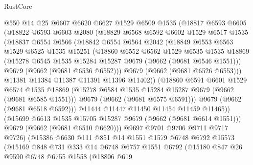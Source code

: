 \begin{lexlean}{RustCore}
\begin{coremodule}
          @550
          @14
          @25
          @6607
          @6620
          @6627
          @1529
          @6509
          @1535
          (@18817
            @6593
            @6605
            (@18822
              @6593
              @6603
              @2080
              (@18829
                @6568
                @6592
                @6602
                @1529
                @6517
                @1535
                (@18837
                  @6554
                  @6566
                  (@18842
                    @6554
                    @6564
                    @2042
                    (@18849
                      @6553
                      @6563
                      @1529
                      @6525
                      @1535
                      @15251
                      (@18860
                        @6552
                        @6562
                        @1529
                        @6535
                        @1535
                        @18869
                        (@15278 @6545 @1535 @15284 @15287 @9679 (@9662 (@9681 @6546 @1551)))
                        @9679
                        (@9662 (@9681 @6536 @6552)))
                      @9679
                      (@9662 (@9681 @6526 @6553)))
                    @11381
                    @11384
                    @11387
                    @11391
                    @11396
                    @11402))
                (@18860
                  @6591
                  @6601
                  @1529
                  @6574
                  @1535
                  @18869
                  (@15278 @6584 @1535 @15284 @15287 @9679 (@9662 (@9681 @6585 @1551)))
                  @9679
                  (@9662 (@9681 @6575 @6591)))
                @9679
                (@9662 (@9681 @6518 @6592)))
              @11444
              @11447
              @11450
              @11454
              @11459
              @11465))
          (@15699 @6613 @1535 @15705 @15287 @9679 (@9662 (@9681 @6614 @1551)))
          @9679
          (@9662 (@9681 @6510 @6620)))
        @9697
        @9701
        @9706
        @9711
        @9717
        @9726)
      (@15386
        @6630
        @111
        @851
        @14
        @1551
        @1579
        @6748
        @6792
        @15573
        (@15169
          @848
          @731
          @333
          @14
          @6748
          @6757
          @1551
          @6792
          (@15180
            @847
            @26
            @9590
            @6748
            @6755
            @1558
            (@18806
              @619

\end{coremodule}
\end{lexlean}
